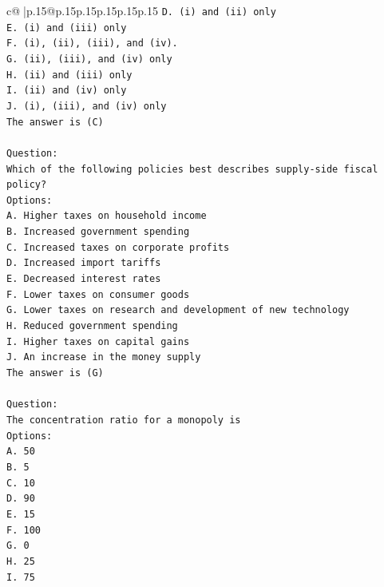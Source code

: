 \documentclass{article}
\begin{document}
{\begin{supertabular}{c@{$\;$}|p{.15\linewidth}@{}p{.15\linewidth}p{.15\linewidth}p{.15\linewidth}p{.15\linewidth}p{.15\linewidth}}
{{{\texttt{D. (i) and (ii) only} \\
\texttt{E. (i) and (iii) only} \\
\texttt{F. (i), (ii), (iii), and (iv).} \\
\texttt{G. (ii), (iii), and (iv) only} \\
\texttt{H. (ii) and (iii) only} \\
\texttt{I. (ii) and (iv) only} \\
\texttt{J. (i), (iii), and (iv) only} \\
\texttt{The answer is (C)} \\
\\ 
\texttt{Question:} \\
\texttt{Which of the following policies best describes supply{-}side fiscal policy?} \\
\texttt{Options:} \\
\texttt{A. Higher taxes on household income} \\
\texttt{B. Increased government spending} \\
\texttt{C. Increased taxes on corporate profits} \\
\texttt{D. Increased import tariffs} \\
\texttt{E. Decreased interest rates} \\
\texttt{F. Lower taxes on consumer goods} \\
\texttt{G. Lower taxes on research and development of new technology} \\
\texttt{H. Reduced government spending} \\
\texttt{I. Higher taxes on capital gains} \\
\texttt{J. An increase in the money supply} \\
\texttt{The answer is (G)} \\
\\ 
\texttt{Question:} \\
\texttt{The concentration ratio for a monopoly is} \\
\texttt{Options:} \\
\texttt{A. 50} \\
\texttt{B. 5} \\
\texttt{C. 10} \\
\texttt{D. 90} \\
\texttt{E. 15} \\
\texttt{F. 100} \\
\texttt{G. 0} \\
\texttt{H. 25} \\
\texttt{I. 75} \\
}}}
\end{supertabular}}
\end{document}
